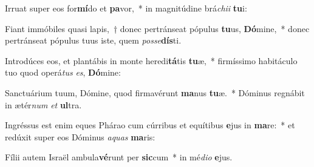 \item Irruat super eos for\textbf{mí}do et \textbf{pa}vor,~* in magnitúdine brá\textit{chi}\textit{i} \textbf{tu}i:
\item Fiant immóbiles quasi lapis,~† donec pertránseat pópulus \textbf{tu}us, \textbf{Dó}mine,~* donec pertránseat pópulus tuus iste, quem \textit{pos}\textit{se}\textbf{dís}ti.
\item Introdúces eos, et plantábis in monte heredi\textbf{tá}tis \textbf{tu}æ,~* firmíssimo habitáculo tuo quod operá\textit{tus} \textit{es}, \textbf{Dó}mine:
\item Sanctuárium tuum, Dómine, quod firmavérunt \textbf{ma}nus \textbf{tu}æ.~* Dóminus regnábit in ætér\textit{num} \textit{et} \textbf{ul}tra.
\item Ingréssus est enim eques Phárao cum cúrribus et equítibus \textbf{e}jus in \textbf{ma}re:~* et redúxit super eos Dóminus \textit{a}\textit{quas} \textbf{ma}ris:
\item Fílii autem Israël ambula\textbf{vé}runt per \textbf{sic}cum~* in mé\textit{di}\textit{o} \textbf{e}jus.
